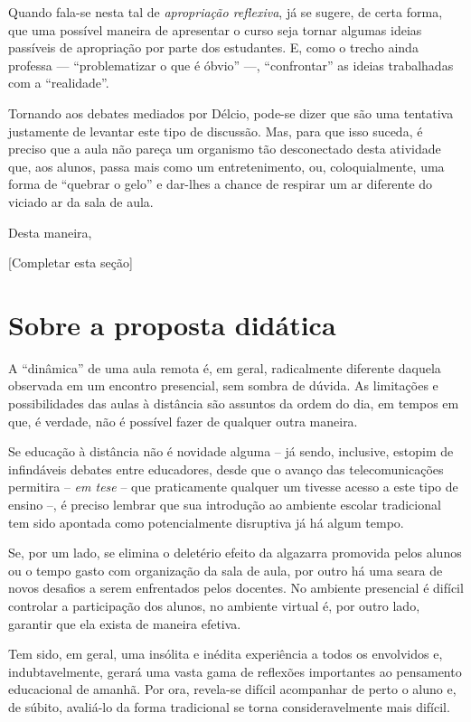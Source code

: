 \documentclass[12pt,a4paper]{article}
\begin{document}
	Quando fala-se nesta tal de \textit{apropriação reflexiva}, já se 
	sugere, de certa forma, que uma possível maneira de apresentar o curso 
	seja tornar algumas ideias passíveis de apropriação por parte dos 
	estudantes. E, como o trecho ainda professa --- ``problematizar o que é 
	óbvio'' ---, ``confrontar'' as ideias trabalhadas com a ``realidade''. 
	
	Tornando aos debates mediados por Délcio, pode-se dizer que são uma 
	tentativa justamente de levantar este tipo de discussão. Mas, para que 
	isso suceda, é preciso que a aula não pareça um organismo tão desconectado 
	desta atividade que, aos alunos, passa mais como um entretenimento, ou, 
	coloquialmente, uma forma de ``quebrar o gelo'' e dar-lhes a chance de 
	respirar um ar diferente do viciado ar da sala de aula. 
	
	Desta maneira, 

	[Completar esta seção]
	
	\newpage
	
	\section{Sobre a proposta didática}
	
	A “dinâmica” de uma aula remota é, em geral, radicalmente diferente 
	daquela observada em um encontro presencial, sem sombra de dúvida. 
	As limitações e possibilidades das aulas à distância são assuntos da 
	ordem do dia, em tempos em que, é verdade, não é possível fazer de 
	qualquer outra maneira.

	Se educação à distância não é novidade alguma -- já sendo, inclusive, 
	estopim de infindáveis debates entre educadores, desde que o avanço 
	das telecomunicações permitira -- \textit{em tese} -- que praticamente 
	qualquer um tivesse acesso 
	a este tipo de ensino --, é preciso lembrar que sua introdução ao 
	ambiente escolar tradicional tem sido apontada como potencialmente 
	disruptiva já há algum tempo. 

	Se, por um lado, se elimina o deletério efeito da algazarra 
	promovida pelos alunos ou o tempo gasto com organização da sala de 
	aula, por outro há uma seara de novos desafios a serem enfrentados 
	pelos docentes. No ambiente presencial é difícil controlar a 
	participação dos alunos, no ambiente virtual é, por outro lado, 
	garantir que ela exista de maneira efetiva. 

	Tem sido, em geral, uma insólita e inédita experiência a todos os 
	envolvidos e, indubtavelmente, gerará uma vasta gama de reflexões 
	importantes ao pensamento educacional de amanhã. Por ora, revela-se 
	difícil acompanhar de perto o aluno e, de súbito, avaliá-lo da forma 
	tradicional se torna consideravelmente mais difícil. 
\end{document}
